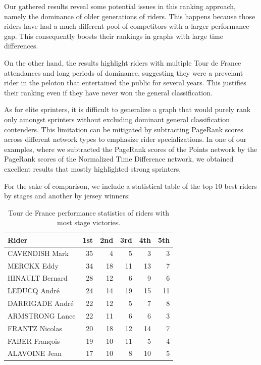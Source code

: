 \documentclass[9pt,twocolumn,twoside]{pnas-report}
\begin{document}
Our gathered results reveal some potential issues in this ranking approach, namely the dominance of older generations of riders.
This happens because those riders have had a much different pool of competitors with a larger performance gap. This consequently 
boosts their rankings in graphs with large time differences. \par
On the other hand, the results highlight riders with multiple Tour de France attendances and long periods of dominance, 
suggesting they were a prevelant rider in the peloton that entertained the public for several years. This justifies their ranking 
even if they have never won the general classification. \par
As for elite sprinters, it is difficult to generalize a graph that would purely rank only amongst sprinters without excluding dominant 
general classification contenders. This limitation can be mitigated by subtracting PageRank scores across different network types to emphasize rider specializations. In one of our examples, 
where we subtracted the PageRank scores of the Points network by the PageRank scores of the Normalized Time Difference network, we obtained 
excellent results that mostly highlighted strong sprinters. \par

For the sake of comparison, we include a statistical table of the top 10 best riders by stages and another by jersey winners:

\begin{table}[ht]
\centering
\begin{tabular}{|l|r|r|r|r|r|}
\hline
\textbf{Rider} & \textbf{1st} & \textbf{2nd} & \textbf{3rd} & \textbf{4th} & \textbf{5th}\\
\hline
CAVENDISH Mark & 35 & 4  & 5  & 3  & 3  \\
MERCKX Eddy    & 34 & 18 & 11 & 13 & 7  \\
HINAULT Bernard& 28 & 12 & 6  & 9  & 6  \\
LEDUCQ André   & 24 & 14 & 19 & 15 & 11 \\
DARRIGADE André& 22 & 12 & 5  & 7  & 8  \\
ARMSTRONG Lance& 22 & 11 & 6  & 6  & 3  \\
FRANTZ Nicolas & 20 & 18 & 12 & 14 & 7  \\
FABER François & 19 & 10 & 11 & 5  & 4  \\
ALAVOINE Jean  & 17 & 10 & 8  & 10 & 5  \\
\hline
\end{tabular}
\caption{Tour de France performance statistics of riders with most stage victories.}
\label{tab:tdf_stats}
\end{table}
\end{document}
